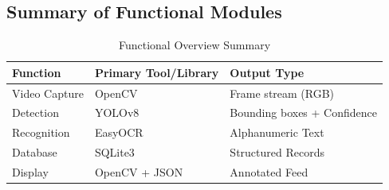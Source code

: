 \subsection*{Summary of Functional Modules}
\begin{table}[h!]
	\centering
	\caption{Functional Overview Summary}
	\begin{tabular}{|l|l|l|}
		\hline
		\textbf{Function} & \textbf{Primary Tool/Library} & \textbf{Output Type} \\ \hline
		Video Capture & OpenCV & Frame stream (RGB) \\ \hline
		Detection & YOLOv8 & Bounding boxes + Confidence \\ \hline
		Recognition & EasyOCR & Alphanumeric Text \\ \hline
		Database & SQLite3 & Structured Records \\ \hline
		Display & OpenCV + JSON & Annotated Feed \\ \hline
	\end{tabular}
\end{table}
